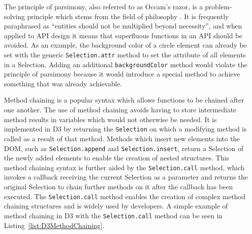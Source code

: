 The principle of parsimony, also referred to as Occam's razor, is a
problem-solving principle which stems from the field of philosophy
\parencite{PrincipleOfParsimony}. It is frequently paraphrased as
\enquote{entities should not be multiplied beyond necessity}, and when
applied to API design it means that superfluous functions in an API
should be avoided. As an example, the background color of a circle
element can already be set with the generic \lstinline{Selection.attr}
method to set the  attribute of all
elements in a Selection. Adding an additional
\lstinline{backgroundColor} method would violate the principle of
parsimony because it would introduce a special method to achieve
something that was already achievable.

Method chaining is a popular syntax which allows functions to be
chained after one another. The use of method chaining avoids having to
store intermediate method results in variables which would not
otherwise be needed. It is implemented in D3 by returning the
\lstinline{Selection} on which a modifying method is called as a
result of that method. Methods which insert new elements into the DOM,
such as \lstinline{Selection.append} and \lstinline{Selection.insert},
return a Selection of the newly added elements to enable the creation
of nested structures. This method chaining syntax is further aided by
the \lstinline{Selection.call} method, which invokes a callback
receiving the current Selection as a parameter and returns the
original Selection to chain further methods on it after the callback
has been executed. The \lstinline{Selection.call} method enables the
creation of complex method chaining structures and is widely used by
developers. A simple example of method chaining in D3 with the
\lstinline{Selection.call} method can be seen in
Listing~\ref{list:D3MethodChaining}.



\begin{samepage}
%
A simple example of method chaining in D3.
A  element and a  element are created
inside an existing  element.
},
]{listings/d3-method-chaining.js}
\end{samepage}


